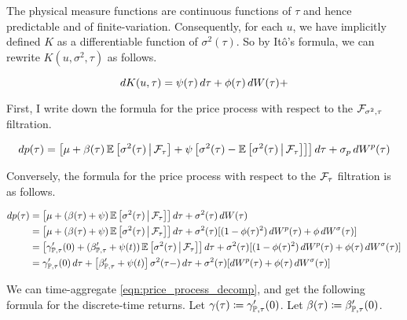 \documentclass[11pt, letterpaper, twoside, final]{article}
\begin{document}
The physical measure functions are continuous functions of $\tau$ and hence predictable and of finite-variation.
Consequently, for each $u$, we have implicitly defined $K$ as a differentiable function of $\sigma^2(\tau)$.
So by It\^{o}'s formula, we can rewrite $K(u, \sigma^2, \tau)$ as follows.

\begin{equation}
    \mathop{}\!d K(u, \tau) = \psi(\tau) \mathop{}\!d \tau + \phi(\tau) \mathop{}\!d W(\tau) + 
\end{equation}



First, I write down the formula for the price process with respect to the $\mathcal{F}_{\sigma^2, \tau}$ filtration.

\begin{align}
    \mathop{}\!d p(\tau) = \left[\mu + \beta(\tau) \operatorname{\mathbb{E}}\left[\sigma^2(\tau)  \,\middle\vert\, \mathcal{F}_{\tau}\right]  + \psi
    \left[\sigma^2(\tau) - \operatorname{\mathbb{E}}\left[\sigma^2(\tau)  \,\middle\vert\, \mathcal{F}_{\tau}\right]\right]\right]  \mathop{}\!d \tau + \sigma_{p}
    \mathop{}\!d W^{p}(\tau) 
\end{align}

Conversely, the formula for the price process with respect to the $\mathcal{F}_{\tau}$ filtration is as follows. 

\begin{align}
    \dif p(\tau) &= \left[\mu + (\beta(\tau) + \psi) \E\left[\sigma^2(\tau)  \mvert \F_{\tau}\right]\right] \dif \tau +
        \sigma^2(\tau) \dif W(\tau)  \\
    &= \left[\mu + (\beta(\tau) + \psi) \E\left[\sigma^2(\tau)  \mvert \F_{\tau}\right]\right] \dif \tau +
        \sigma^2(\tau) [(1 - \phi(\tau)^2) \dif W^{p}(\tau) + \phi \dif W^{\sigma}(\tau)] \\
    &= \left[\gamma_{\PP, \tau}'(0) + (\beta_{\PP, \tau}'  + \psi(t) ) \E\left[\sigma^2(\tau)  \mvert
        \F_{\tau}\right]\right] \dif \tau + \sigma^2(\tau) [(1 - \phi(\tau)^2)\dif W^{p}(\tau) + \phi(\tau) \dif
        W^{\sigma}(\tau)] \\ 
        \label{eqn:price_process_decomp}
    &= \gamma_{\PP, \tau}'(0) \dif \tau + \left[\beta_{\PP, \tau}'  + \psi(t)\right] \sigma^2(\tau-) \dif \tau +
       \sigma^2(\tau) [\dif W^{p}(\tau) + \phi(\tau) \dif W^{\sigma}(\tau)]
\end{align}


We can time-aggregate \cref{eqn:price_process_decomp}, and get the following formula for the discrete-time
returns.  
Let $\gamma(\tau) \coloneqq \gamma_{\mathbb{P}, \tau}'(0)$.
Let $\beta(\tau) \coloneqq \beta_{\mathbb{P}, \tau}'(0)$.
\end{document}
